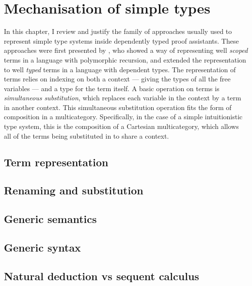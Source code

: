 \chapter{Mechanisation of simple types}\label{sec:simple}

In this chapter, I review and justify the family of approaches usually used to
represent simple type systems inside dependently typed proof assistants.
These approaches were first presented by \citet{AR99}, who showed a way of
representing well \emph{scoped} terms in a language with polymorphic recursion,
and extended the representation to well \emph{typed} terms in a language with
dependent types.
The representation of terms relies on indexing on both a context --- giving the
types of all the free variables --- and a type for the term itself.
A basic operation on terms is \emph{simultaneous substitution}, which replaces
each variable in the context by a term in another context.
This simultaneous substitution operation fits the form of composition in a
multicategory.
Specifically, in the case of a simple intuitionistic type system, this is the
composition of a Cartesian multicategory, which allows all of the terms being
substituted in to share a context.

\section{Term representation}

\section{Renaming and substitution}\label{sec:kits}

\section{Generic semantics}

\section{Generic syntax}
\section{Natural deduction vs sequent calculus}

